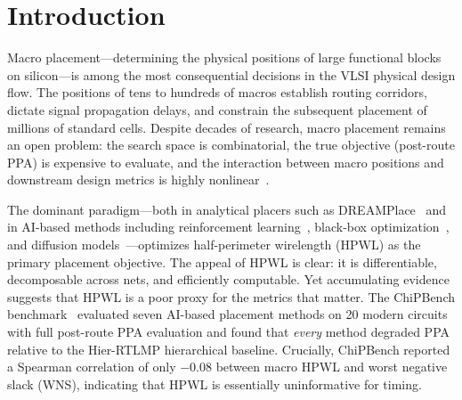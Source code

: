 \documentclass[sigconf,anonymous,review,9pt]{acmart}
\begin{document}

\maketitle

\section{Introduction}
\label{sec:intro}

Macro placement---determining the physical positions of large functional blocks on silicon---is among the most consequential decisions in the VLSI physical design flow. The positions of tens to hundreds of macros establish routing corridors, dictate signal propagation delays, and constrain the subsequent placement of millions of standard cells. Despite decades of research, macro placement remains an open problem: the search space is combinatorial, the true objective (post-route PPA) is expensive to evaluate, and the interaction between macro positions and downstream design metrics is highly nonlinear~\cite{lin2019dreamplace, mirhoseini2021graph}.

The dominant paradigm---both in analytical placers such as DREAMPlace~\cite{lin2019dreamplace} and in AI-based methods including reinforcement learning~\cite{mirhoseini2021graph, lai2022maskplace, lai2023chipformer}, black-box optimization~\cite{shi2023wire}, and diffusion models~\cite{lee2024chip}---optimizes half-perimeter wirelength (HPWL) as the primary placement objective. The appeal of HPWL is clear: it is differentiable, decomposable across nets, and efficiently computable. Yet accumulating evidence suggests that HPWL is a poor proxy for the metrics that matter. The ChiPBench benchmark~\cite{chipbench2025} evaluated seven AI-based placement methods on 20 modern circuits with full post-route PPA evaluation and found that \emph{every} method degraded PPA relative to the Hier-RTLMP hierarchical baseline. Crucially, ChiPBench reported a Spearman correlation of only $-0.08$ between macro HPWL and worst negative slack (WNS), indicating that HPWL is essentially uninformative for timing.
\end{document}
